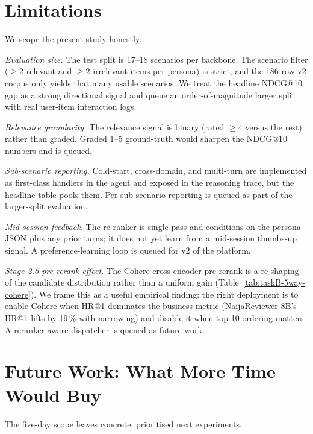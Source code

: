 \documentclass[sigconf,nonacm,balance]{acmart}
\begin{document}
\section{Limitations}
\label{sec:limitations}

We scope the present study honestly.

\emph{Evaluation size.} The test split is 17--18 scenarios per backbone.
The scenario filter ($\geq 2$ relevant and $\geq 2$ irrelevant items per
persona) is strict, and the 186-row v2 corpus only yields that many usable
scenarios. We treat the headline NDCG@10 gap as a strong directional signal
and queue an order-of-magnitude larger split with real user-item
interaction logs.

\emph{Relevance granularity.} The relevance signal is binary (rated
$\geq 4$ versus the rest) rather than graded. Graded 1--5 ground-truth
would sharpen the NDCG@10 numbers and is queued.

\emph{Sub-scenario reporting.} Cold-start, cross-domain, and multi-turn are
implemented as first-class handlers in the agent and exposed in the
reasoning trace, but the headline table pools them. Per-sub-scenario
reporting is queued as part of the larger-split evaluation.

\emph{Mid-session feedback.} The re-ranker is single-pass and conditions
on the persona JSON plus any prior turns; it does not yet learn from a
mid-session thumbs-up signal. A preference-learning loop is queued for
v2 of the platform.

\emph{Stage-2.5 pre-rerank effect.} The Cohere cross-encoder pre-rerank
is a re-shaping of the candidate distribution rather than a uniform gain
(Table~\ref{tab:taskB-5way-cohere}). We frame this as a useful empirical
finding: the right deployment is to enable Cohere when HR@1 dominates the
business metric (NaijaReviewer-8B's HR@1 lifts by 19\,\% with narrowing)
and disable it when top-10 ordering matters. A reranker-aware dispatcher
is queued as future work.

\section{Future Work: What More Time Would Buy}
\label{sec:futurework}

The five-day scope leaves concrete, prioritised next experiments.
\end{document}
